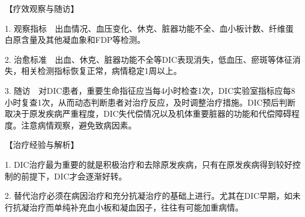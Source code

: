 【疗效观察与随访】

1.
观察指标　出血情况、血压变化、休克、脏器功能不全、血小板计数、纤维蛋白原含量及其他凝血象和FDP等检测。

2.
治愈标准　出血、休克、脏器功能不全等DIC表现消失，低血压、瘀斑等体征消失，相关检测指标恢复正常，病情稳定1周以上。

3.
随访　对DIC患者，重要生命指征应当每4小时检查1次，DIC实验室指标应每8小时复查1次，从而动态判断患者对治疗反应，及时调整治疗措施。DIC预后判断取决于原发疾病严重程度，DIC失代偿情况以及机体重要脏器的功能和代偿障碍程度。注意病情观察，避免致病因素。

【治疗经验与解析】

1.
DIC治疗最为重要的就是积极治疗和去除原发疾病，只有在原发疾病得到较好控制的前提下，DIC才会逐渐好转。

2.
替代治疗必须在病因治疗和充分抗凝治疗的基础上进行。尤其在DIC早期，如未行抗凝治疗而单纯补充血小板和凝血因子，往往有可能加重病情。
